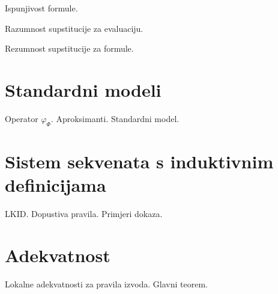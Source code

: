 \begin{definition}
  Ispunjivost formule.
\end{definition}

\begin{lemma}
  Razumnost supstitucije za evaluaciju.
\end{lemma}
\begin{lemma}
  Rezumnost supstitucije za formule.
\end{lemma}

\section{Standardni modeli}\label{sec:standardni-modeli}
Operator \(\varphi_{\Phi}\). Aproksimanti. Standardni model.

\section{Sistem sekvenata s induktivnim definicijama}\label{sec:sistem-sekvenata}
LKID. Dopustiva pravila. Primjeri dokaza.

\section{Adekvatnost}\label{sec:adekvatnost}
Lokalne adekvatnosti za pravila izvoda. Glavni teorem.

